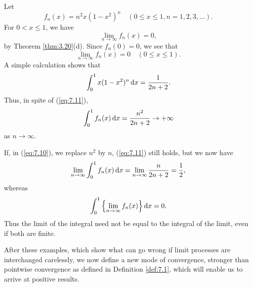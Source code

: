 \begin{myExample}
    \label{myExample:7.6}
    Let 
    \begin{equation}
        \label{eq:7.10}
        f_n(x) = n^2 x(1-x^2)^n
        \quad 
        (0 \leq x \leq 1, n = 1,2,3,\dots).
    \end{equation}
    For $0 < x \leq 1$, we have 
    \begin{equation*}
        \lim_{n \to \infty} f_n (x) = 0,
    \end{equation*}
    by Theorem \ref{thm:3.20}(d). Since $f_n(0) = 0$, we see that
    \begin{equation}
        \label{eq:7.11}
        \lim_{n \to \infty} f_n (x) = 0
        \quad 
        (0 \leq x \leq 1).
    \end{equation}
    A simple calculation shows that 
    \begin{equation*}
        \int_{0}^{1} x(1-x^2)^n \d x = \frac{1}{2n+2}.
    \end{equation*}
    Thus, in spite of (\ref{eq:7.11}),
    \begin{equation*}
        \int_{0}^{1} f_n(x) \d x = \frac{n^2}{2n+2} \rightarrow +\infty
    \end{equation*}
    as $n \rightarrow \infty$.

    If, in (\ref{eq:7.10}), we replace $n^2$ by $n$,
    (\ref{eq:7.11}) still holds, but we now have 
    \begin{equation*}
        \lim_{n \to \infty} \int_{0}^{1} f_n (x) \d x = 
        \lim_{n \to \infty} \frac{n}{2n+2} = \frac{1}{2},
    \end{equation*}
    whereas 
    \begin{equation*}
        \int_{0}^{1} \left\{ \lim_{n \to \infty} f_n (x) \right\} \d x = 0.
    \end{equation*}
    Thus the limit of the integral need not be equal to the integral of the limit, even if both are finite.
\end{myExample}
After these examples, which show what can go wrong if limit processes
are interchanged carelessly, 
we now define a new mode of convergence, 
stronger than pointwise convergence as defined in Definition {\ref{def:7.1}}, 
which will enable us to arrive at positive results.
